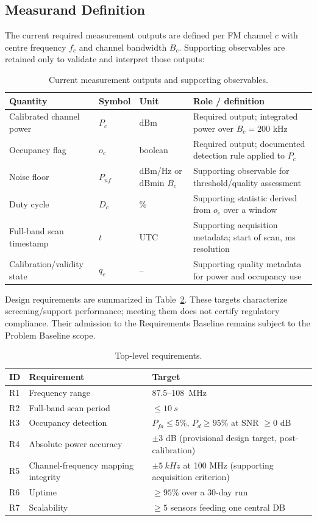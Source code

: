 \documentclass[12pt,a4paper]{report}
\newcommand{\dBm}{\ensuremath{\mathrm{dBm}}}
\newcommand{\MHz}{\ensuremath{\mathrm{MHz}}}
\begin{document}
 \subsection*{Measurand Definition}
 The current required measurement outputs are defined per FM channel $c$ with centre frequency
 $f_c$ and channel bandwidth $B_c$. Supporting observables are retained only to validate and interpret those outputs:
 \begin{table}[htbp]
 	\centering\small
 	\caption{Current measurement outputs and supporting observables.}
 	\label{tab:measurand}
 	\begin{tabular}{@{}llll@{}}
 		\toprule
 		\textbf{Quantity} & \textbf{Symbol} & \textbf{Unit} & \textbf{Role / definition} \\
 		\midrule
 		Calibrated channel power & $P_c$ & \dBm & Required output; integrated power over $B_c=200$ kHz \\
 		Occupancy flag & $o_c$ & boolean & Required output; documented detection rule applied to $P_c$ \\
 		Noise floor & $P_{nf}$ & \dBm/Hz or \dBm in $B_c$ & Supporting observable for threshold/quality assessment \\
 		Duty cycle & $D_c$ & \% & Supporting statistic derived from $o_c$ over a window \\
 		Full-band scan timestamp & $t$ & UTC & Supporting acquisition metadata; start of scan, ms resolution \\
 		Calibration/validity state & $q_c$ & -- & Supporting quality metadata for power and occupancy use \\
 		\bottomrule
 	\end{tabular}
 \end{table}
 Design requirements are summarized in Table~\ref{tab:reqs}. These targets characterize screening/support performance; meeting them does not certify regulatory compliance. Their admission to the Requirements Baseline remains subject to the Problem Baseline scope.
 \begin{table}[htbp]
 	\centering
 	\caption{Top-level requirements.}
 	\label{tab:reqs}
 	\begin{tabular}{@{}lll@{}}
 		\toprule
 		\textbf{ID} & \textbf{Requirement} & \textbf{Target} \\
 		\midrule
 		R1 & Frequency range & 87.5--\SI{108}{\MHz} \\
 		R2 & Full-band scan period & $\leq \SI{10}{s}$ \\
 		R3 & Occupancy detection & $P_{fa} \le 5\%$, $P_d \ge 95\%$ at SNR $\ge 0$ dB \\
 		R4 & Absolute power accuracy & $\pm 3$ dB (provisional design target, post-calibration) \\
 		R5 & Channel-frequency mapping integrity & $\pm \SI{5}{kHz}$ at 100 MHz (supporting acquisition criterion) \\
 		R6 & Uptime & $\ge 95\%$ over a 30-day run \\
 		R7 & Scalability & $\ge 5$ sensors feeding one central DB \\
 		\bottomrule
 	\end{tabular}
 \end{table}
\end{document}
